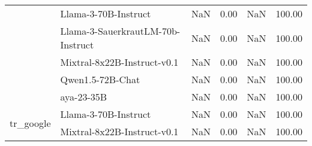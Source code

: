 \begin{tabular}{llrrrr}
 & Llama-3-70B-Instruct & NaN & 0.00 & NaN & 100.00 \\
 & Llama-3-SauerkrautLM-70b-Instruct & NaN & 0.00 & NaN & 100.00 \\
 & Mixtral-8x22B-Instruct-v0.1 & NaN & 0.00 & NaN & 100.00 \\
 & Qwen1.5-72B-Chat & NaN & 0.00 & NaN & 100.00 \\
 & aya-23-35B & NaN & 0.00 & NaN & 100.00 \\
\cline{1-6}
\multirow[t]{2}{*}{tr_google} & Llama-3-70B-Instruct & NaN & 0.00 & NaN & 100.00 \\
 & Mixtral-8x22B-Instruct-v0.1 & NaN & 0.00 & NaN & 100.00 \\
\cline{1-6}
\bottomrule
\end{tabular}
